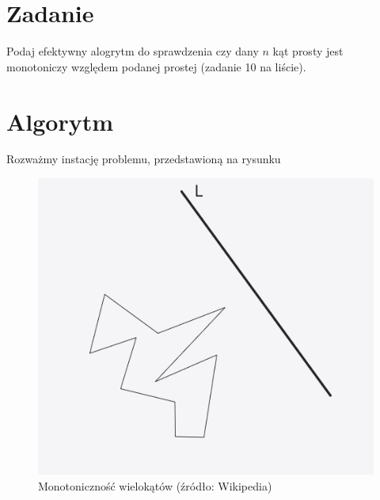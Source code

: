 \documentclass[12pt, a4paper]{article}
\begin{document}
\section*{Zadanie}

Podaj efektywny alogrytm do sprawdzenia czy dany $n$ kąt prosty jest monotoniczy względem podanej prostej (zadanie 10 na liście).
 
\section*{Algorytm}

Rozważmy instację problemu, przedstawioną na rysunku 

\begin{figure}[H]
  \begin{center}
  \includegraphics[scale=0.3]{Sample1}
  \caption{Monotoniczność wielokątów (źródło: Wikipedia)}
  \label{fig:instancja_1}
  \end{center}
\end{figure}
\end{document}
